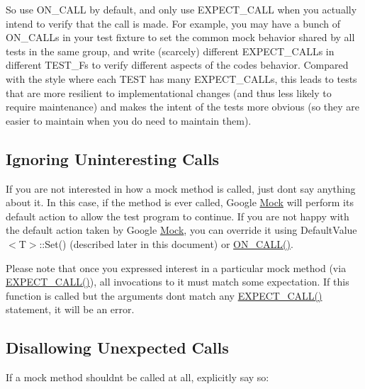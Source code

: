 So use {\ttfamily O\+N\+\_\+\+C\+A\+LL} by default, and only use {\ttfamily E\+X\+P\+E\+C\+T\+\_\+\+C\+A\+LL} when you actually intend to verify that the call is made. For example, you may have a bunch of {\ttfamily O\+N\+\_\+\+C\+A\+LL}s in your test fixture to set the common mock behavior shared by all tests in the same group, and write (scarcely) different {\ttfamily E\+X\+P\+E\+C\+T\+\_\+\+C\+A\+LL}s in different {\ttfamily T\+E\+S\+T\+\_\+F}s to verify different aspects of the code\textquotesingle{}s behavior. Compared with the style where each {\ttfamily T\+E\+ST} has many {\ttfamily E\+X\+P\+E\+C\+T\+\_\+\+C\+A\+LL}s, this leads to tests that are more resilient to implementational changes (and thus less likely to require maintenance) and makes the intent of the tests more obvious (so they are easier to maintain when you do need to maintain them).

\subsection*{Ignoring Uninteresting Calls}

If you are not interested in how a mock method is called, just don\textquotesingle{}t say anything about it. In this case, if the method is ever called, Google \hyperlink{class_mock}{Mock} will perform its default action to allow the test program to continue. If you are not happy with the default action taken by Google \hyperlink{class_mock}{Mock}, you can override it using {\ttfamily Default\+Value$<$T$>$\+::\+Set()} (described later in this document) or {\ttfamily \hyperlink{gmock-spec-builders_8h_a5b12ae6cf84f0a544ca811b380c37334}{O\+N\+\_\+\+C\+A\+L\+L()}}.

Please note that once you expressed interest in a particular mock method (via {\ttfamily \hyperlink{gmock-spec-builders_8h_a535a6156de72c1a2e25a127e38ee5232}{E\+X\+P\+E\+C\+T\+\_\+\+C\+A\+L\+L()}}), all invocations to it must match some expectation. If this function is called but the arguments don\textquotesingle{}t match any {\ttfamily \hyperlink{gmock-spec-builders_8h_a535a6156de72c1a2e25a127e38ee5232}{E\+X\+P\+E\+C\+T\+\_\+\+C\+A\+L\+L()}} statement, it will be an error.

\subsection*{Disallowing Unexpected Calls}

If a mock method shouldn\textquotesingle{}t be called at all, explicitly say so\+:


